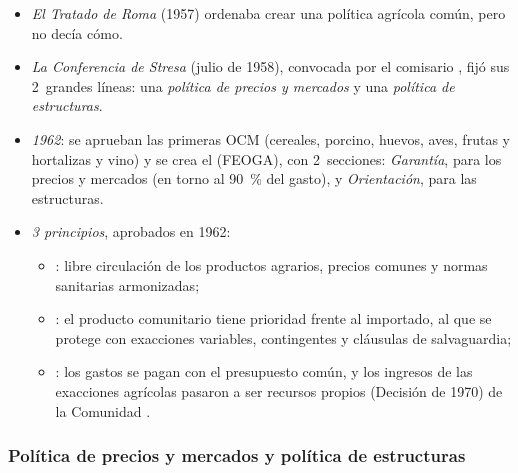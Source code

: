 \documentclass[11pt]{article}
\begin{document}
\begin{itemize}
\item \emph{El Tratado de Roma} (1957) ordenaba crear una política agrícola común, pero no decía cómo.
\item \emph{La Conferencia de Stresa} (julio de 1958), convocada por el comisario , fijó sus 2~grandes líneas: una \emph{política de precios y mercados} y una \emph{política de estructuras}.
\item \emph{1962}: se aprueban las primeras OCM (cereales, porcino, huevos, aves, frutas y hortalizas y vino) y se crea el  (FEOGA), con 2~secciones: \emph{Garantía}, para los precios y mercados (en torno al 90~\% del gasto), y \emph{Orientación}, para las estructuras.
\item \emph{3 principios}, aprobados en 1962:
  \begin{itemize}
  \item {}: libre circulación de los productos agrarios, precios comunes y normas sanitarias armonizadas;
  \item {}: el producto comunitario tiene prioridad frente al importado, al que se protege con exacciones variables, contingentes y cláusulas de salvaguardia;
  \item {}: los gastos se pagan con el presupuesto común, y los ingresos de las exacciones agrícolas pasaron a ser recursos propios (Decisión de 1970) de la Comunidad .
  \end{itemize}
\end{itemize}

\subsubsection{Política de precios y mercados y política de estructuras}\label{sec:precios-estructuras}
\end{document}
